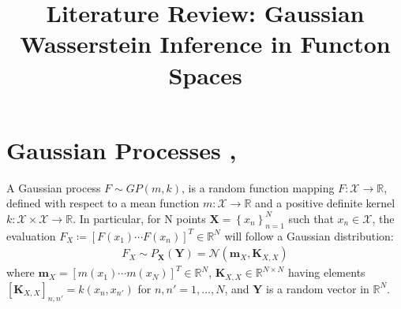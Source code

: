 \documentclass[twoside,11pt]{article}
\begin{document}
\title{Literature Review: Gaussian Wasserstein Inference in Functon Spaces}
\maketitle
\section{Gaussian Processes \cite{wild2022generalized}, \cite{wild2023connections}}
A Gaussian process $F \sim GP(m, k)$, is a random function mapping $F: \mathcal{X} \rightarrow \mathbb{R}$, defined with respect to a mean function $m: \mathcal{X} \rightarrow \mathbb{R}$ and a positive definite kernel $k: \mathcal{X} \times \mathcal{X} \rightarrow \mathbb{R}$. In particular, for N points $\mathbf{X} = \left\{ x_n\right\}_{n=1}^N$ such that $x_n \in \mathcal{X}$, the evaluation $F_X \coloneqq \left[F(x_1) \cdots F(x_n)\right]^T \in \mathbb{R}^N$ will follow a Gaussian distribution:
\begin{align}
    F_X \sim P_{\mathbf{X}}(\mathbf{Y}) = \mathcal{N}(\mathbf{m}_X, \mathbf{K}_{X, X})
    \label{gp-prior}
\end{align}
where $\mathbf{m}_X = \left[ m(x_1) \cdots m(x_N)\right]^T \in \mathbb{R}^N$, $\mathbf{K}_{X, X} \in \mathbb{R}^{N \times N}$ having elements $\left[\mathbf{K}_{X, X}\right]_{n, n'} = k(x_n, x_{n'})$ for $n, n'=1,\dots, N$, and $\mathbf{Y}$ is a random vector in $\mathbb{R}^N$.
\end{document}
